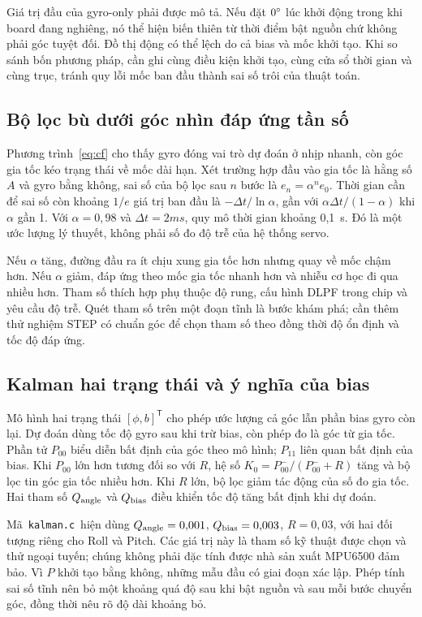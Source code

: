 Giá trị đầu của gyro-only phải được mô tả. Nếu đặt $0^{\circ}$ lúc khởi động trong khi board đang nghiêng, nó thể hiện biến thiên từ thời điểm bật nguồn chứ không phải góc tuyệt đối. Đồ thị động có thể lệch do cả bias và mốc khởi tạo. Khi so sánh bốn phương pháp, cần ghi cùng điều kiện khởi tạo, cùng cửa sổ thời gian và cùng trục, tránh quy lỗi mốc ban đầu thành sai số trôi của thuật toán.

\subsection{Bộ lọc bù dưới góc nhìn đáp ứng tần số}
Phương trình~\eqref{eq:cf} cho thấy gyro đóng vai trò dự đoán ở nhịp nhanh, còn góc gia tốc kéo trạng thái về mốc dài hạn. Xét trường hợp đầu vào gia tốc là hằng số $A$ và gyro bằng không, sai số của bộ lọc sau $n$ bước là $e_n=\alpha^n e_0$. Thời gian cần để sai số còn khoảng $1/e$ giá trị ban đầu là $-\Delta t/\ln\alpha$, gần với $\alpha\Delta t/(1-\alpha)$ khi $\alpha$ gần 1. Với $\alpha=0{,}98$ và $\Delta t=2\unit{ms}$, quy mô thời gian khoảng 0,1~s. Đó là một ước lượng lý thuyết, không phải số đo độ trễ của hệ thống servo.

Nếu $\alpha$ tăng, đường đầu ra ít chịu xung gia tốc hơn nhưng quay về mốc chậm hơn. Nếu $\alpha$ giảm, đáp ứng theo mốc gia tốc nhanh hơn và nhiễu cơ học đi qua nhiều hơn. Tham số thích hợp phụ thuộc độ rung, cấu hình DLPF trong chip và yêu cầu độ trễ. Quét tham số trên một đoạn tĩnh là bước khám phá; cần thêm thử nghiệm STEP có chuẩn góc để chọn tham số theo đồng thời độ ổn định và tốc độ đáp ứng.

\subsection{Kalman hai trạng thái và ý nghĩa của bias}
Mô hình hai trạng thái $[\phi,b]^\mathsf{T}$ cho phép ước lượng cả góc lẫn phần bias gyro còn lại. Dự đoán dùng tốc độ gyro sau khi trừ bias, còn phép đo là góc từ gia tốc. Phần tử $P_{00}$ biểu diễn bất định của góc theo mô hình; $P_{11}$ liên quan bất định của bias. Khi $P_{00}$ lớn hơn tương đối so với $R$, hệ số $K_0=P_{00}^{-}/(P_{00}^{-}+R)$ tăng và bộ lọc tin góc gia tốc nhiều hơn. Khi $R$ lớn, bộ lọc giảm tác động của số đo gia tốc. Hai tham số $Q_{\rm angle}$ và $Q_{\rm bias}$ điều khiển tốc độ tăng bất định khi dự đoán.

Mã \,\texttt{kalman.c}\, hiện dùng $Q_{\rm angle}=0{,}001$, $Q_{\rm bias}=0{,}003$, $R=0{,}03$, với hai đối tượng riêng cho Roll và Pitch. Các giá trị này là tham số kỹ thuật được chọn và thử ngoại tuyến; chúng không phải đặc tính được nhà sản xuất MPU6500 đảm bảo. Vì $P$ khởi tạo bằng không, những mẫu đầu có giai đoạn xác lập. Phép tính sai số tĩnh nên bỏ một khoảng quá độ sau khi bật nguồn và sau mỗi bước chuyển góc, đồng thời nêu rõ độ dài khoảng bỏ.

